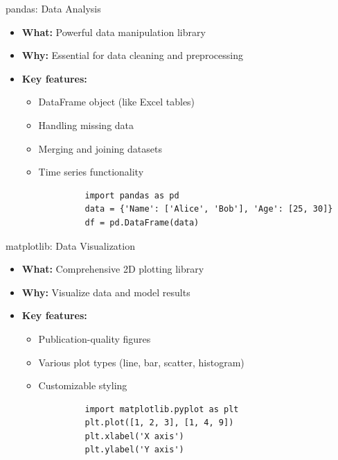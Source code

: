 \documentclass{beamer}
\begin{document}
	\begin{frame}[fragile]{pandas: Data Analysis}
		\begin{itemize}
			\item \textbf{What:} Powerful data manipulation library
			\item \textbf{Why:} Essential for data cleaning and preprocessing
			\item \textbf{Key features:}
			\begin{itemize}
				\item DataFrame object (like Excel tables)
				\item Handling missing data
				\item Merging and joining datasets
				\item Time series functionality
			\end{itemize}
		\end{itemize}
		
		\begin{example}
			\begin{lstlisting}
				import pandas as pd
				data = {'Name': ['Alice', 'Bob'], 'Age': [25, 30]}
				df = pd.DataFrame(data)
			\end{lstlisting}
		\end{example}
	\end{frame}
	
	\begin{frame}[fragile]{matplotlib: Data Visualization}
		\begin{itemize}
			\item \textbf{What:} Comprehensive 2D plotting library
			\item \textbf{Why:} Visualize data and model results
			\item \textbf{Key features:}
			\begin{itemize}
				\item Publication-quality figures
				\item Various plot types (line, bar, scatter, histogram)
				\item Customizable styling
			\end{itemize}
		\end{itemize}
		
		\begin{example}
			\begin{lstlisting}
				import matplotlib.pyplot as plt
				plt.plot([1, 2, 3], [1, 4, 9])
				plt.xlabel('X axis')
				plt.ylabel('Y axis')
			\end{lstlisting}
		\end{example}
	\end{frame}
	
\end{document}
